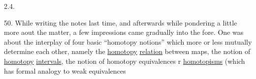 2.4.

50. While writing the notes last time, and afterwards while pondering
a little more aout the matter, a few impressions came gradually into the
fore. One was about the interplay of four basic ``homotopy notions'' which
more or less mutually determine each other, namely the \uline{homotopy} \uline{relation}
between maps, the notion of \uline{homotopy} \uline{intervals}, the notion of homotopy
equivalences r \uline{homotopisms} (which has formal analogy to weak equivalences\hand{,}

